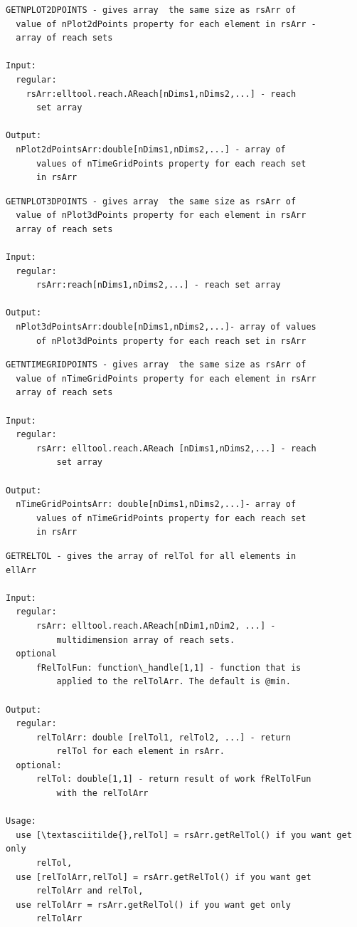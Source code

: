 \documentclass[letterpaper,10pt,english]{sphinxmanual}
\begin{document}
\label{chap_func:elltool-reach-areach-getnplot2dpoints}
\begin{Verbatim}[commandchars=\\\{\}]
GETNPLOT2DPOINTS - gives array  the same size as rsArr of
  value of nPlot2dPoints property for each element in rsArr -
  array of reach sets

Input:
  regular:
    rsArr:elltool.reach.AReach[nDims1,nDims2,...] - reach
      set array

Output:
  nPlot2dPointsArr:double[nDims1,nDims2,...] - array of
      values of nTimeGridPoints property for each reach set
      in rsArr
\end{Verbatim}
\label{chap_func:elltool-reach-areach-getnplot3dpoints}
\begin{Verbatim}[commandchars=\\\{\}]
GETNPLOT3DPOINTS - gives array  the same size as rsArr of
  value of nPlot3dPoints property for each element in rsArr
  array of reach sets

Input:
  regular:
      rsArr:reach[nDims1,nDims2,...] - reach set array

Output:
  nPlot3dPointsArr:double[nDims1,nDims2,...]- array of values
      of nPlot3dPoints property for each reach set in rsArr
\end{Verbatim}
\label{chap_func:elltool-reach-areach-getntimegridpoints}
\begin{Verbatim}[commandchars=\\\{\}]
GETNTIMEGRIDPOINTS - gives array  the same size as rsArr of
  value of nTimeGridPoints property for each element in rsArr
  array of reach sets

Input:
  regular:
      rsArr: elltool.reach.AReach [nDims1,nDims2,...] - reach
          set array

Output:
  nTimeGridPointsArr: double[nDims1,nDims2,...]- array of
      values of nTimeGridPoints property for each reach set
      in rsArr
\end{Verbatim}
\label{chap_func:elltool-reach-areach-getreltol}
\begin{Verbatim}[commandchars=\\\{\}]
GETRELTOL - gives the array of relTol for all elements in
ellArr

Input:
  regular:
      rsArr: elltool.reach.AReach[nDim1,nDim2, ...] -
          multidimension array of reach sets.
  optional
      fRelTolFun: function\_handle[1,1] - function that is
          applied to the relTolArr. The default is @min.

Output:
  regular:
      relTolArr: double [relTol1, relTol2, ...] - return
          relTol for each element in rsArr.
  optional:
      relTol: double[1,1] - return result of work fRelTolFun
          with the relTolArr

Usage:
  use [\textasciitilde{},relTol] = rsArr.getRelTol() if you want get only
      relTol,
  use [relTolArr,relTol] = rsArr.getRelTol() if you want get
      relTolArr and relTol,
  use relTolArr = rsArr.getRelTol() if you want get only
      relTolArr
\end{Verbatim}
\end{document}
